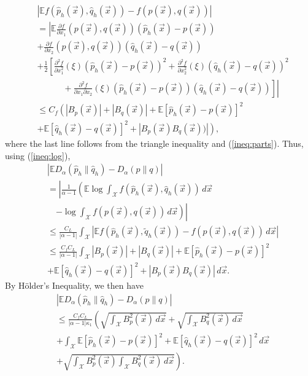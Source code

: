 \documentclass{article}
\newcommand{\X}{\mathcal{X}}                        %
\newcommand{\E}{\mathbb{E}}                         %
\newcommand{\cpest}{\widehat{p}_h}                  %
\newcommand{\cqest}{\widehat{q}_h}                  %
\newcommand{\qest}{\widetilde{q}_h}                 %
\newcommand{\vx}{\vec{x}}                           %
\begin{document}
\begin{align*}
& \left| \E f(\cpest(\vx), \cqest(\vx)) - f(p(\vx),q(\vx)) \right|  \\
    & = \left|
        \E\frac{\partial f}{\partial x_1}(p(\vx),q(\vx))(\cpest(\vx) - p(\vx)) \right.  \\
    & + \frac{\partial f}{\partial x_2}(p(\vx),q(\vx))(\cqest(\vx) - q(\vx))  \\
    & + \frac12 \left[
            \frac{\partial^2 f}{\partial x_1^2}(\xi)(\cpest(\vx) - p(\vx))^2
        \right.
      + \frac{\partial^2 f}{\partial x_2^2}(\xi)(\cqest(\vx) - q(\vx))^2 \\
    & \quad\quad\quad + \left. \left.
            \frac{\partial^2 f}{\partial x_1 \partial x_2}(\xi)
                    (\cpest(\vx) - p(\vx))(\cqest(\vx) - q(\vx))
        \right] \right| \\
    & \leq C_f \left(
        \left| B_p(\vx) \right|
      + \left| B_q(\vx) \right| \right.
      + \E \left[ \cpest(\vx) - p(\vx) \right]^2    \\
    & + \E \left[ \cqest(\vx) - q(\vx) \right]^2
      + \left. \left| B_p(\vx)B_q(\vx)) \right|
    \right),
\end{align*}
where the last line follows from the triangle inequality and
(\ref{ineq:parts}). Thus, using (\ref{ineq:log}),
\begin{align*}
 & |\E D_\alpha(\cpest \| \cqest) - D_\alpha(p \| q)|   \\
 &  = \left| \frac{1}{\alpha - 1} \left(
        \E \log  \int_\X f(\cpest(\vx),\cqest(\vx)) \, d\vx \right. \right. \\
 &  \quad \left. \left. - \log \int_\X f(p(\vx),q(\vx)) \, d\vx
      \right) \right| \\
 &  \leq \frac{C_L}{|\alpha - 1|}
    \int_\X \left| \E f(\cpest(\vx),\qest(\vx)) - f(p(\vx),q(\vx)) \, d\vx
\right| \\
 &  \leq \frac{C_fC_L}{|\alpha - 1|}
    \int_\X \left| B_p(\vx) \right|
    + \left| B_q(\vx) \right|
    + \E \left[ \cpest(\vx) - p(\vx) \right]^2  \\
 &  + \E \left[ \cqest(\vx) - q(\vx) \right]^2
    + \left| B_p(\vx)B_q(\vx) \right| \, d\vx.
\end{align*}
By H\"{o}lder's Inequality, we then have
\begin{align*}
 & |\E D_\alpha(\cpest \| \cqest) - D_\alpha(p \| q)|   \\
 &  \leq \frac{C_fC_L}{|\alpha - 1|\kappa_1} \left(
    \sqrt{\int_\X B_p^2(\vx) \, d\vx} \right.
    + \sqrt{\int_\X B_q^2(\vx) \, d\vx} \\
 &  + \int_\X \E \left[ \cpest(\vx) - p(\vx) \right]^2
    + \E \left[ \cqest(\vx) - q(\vx) \right]^2 \, d\vx       \\
 &  + \left. \sqrt{\int_\X B_p^2(\vx)
            \int_\X B_q^2(\vx) \, d\vx} \right).
\end{align*}
\end{document}
